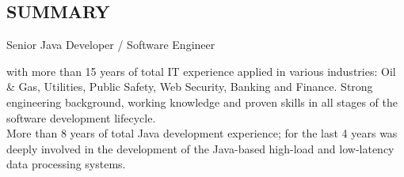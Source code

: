 \documentclass{res}
\newif\ifFullVersion
\begin{document}
\begin{resume}

\section{SUMMARY}
\vspace{1pt} %
\ifFullVersion
\noindent Team Lead / Principal Software Developer
\else
\noindent Senior Java Developer / Software Engineer
\fi
with more than 15 years of total IT experience applied in various industries: Oil \& Gas, Utilities, Public Safety, Web Security, Banking and Finance. Strong engineering background, working knowledge and proven skills in all stages of the software development lifecycle.\\
\ifFullVersion
\indent More than 5~years of team leading experience, able to interact well at all levels and articulate the IT-specific issues to non-IT colleagues in a clear business-transparent way. Praised for the ability to translate the complex functional and non-functional requirements into simple, convenient for implementation and testing architecture.\\
\indent Looking for a challenging role where my skills and qualifications will add value and make a significant contribution to the company.
\else
 \indent More than 8 years of total Java development experience; for the last 4 years was deeply involved in the development of the Java-based high-load and low-latency data processing systems.
\fi

\ifFullVersion

\end{resume}
\end{document}

